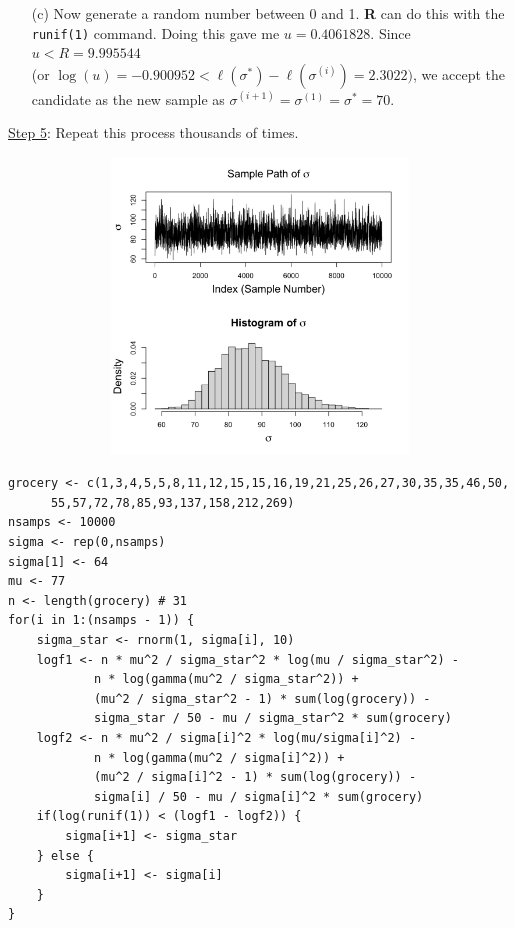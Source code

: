 \documentclass[11pt]{article}
\begin{document}
\begin{enumerate}
\item[(c)] Now generate a random number between 0 and 1. {\bf R} can do this with the \texttt{runif(1)} command. Doing this gave me $u=0.4061828$. Since $u<R=9.995544$ \\(or $\log(u)=-0.900952<\ell(\sigma^*)-\ell\left(\sigma^{(i)}\right)=2.3022)$, we accept the candidate as the new sample as $\sigma^{(i+1)}=\sigma^{(1)}=\sigma^{*}=70$.
\end{enumerate}

\uline{Step 5}: Repeat this process thousands of times.
\begin{figure}[H]
\centering
\includegraphics[width=4.7in,height=3.1in]{bayes_figs/Plots_sigma_metropolis.png} 
\end{figure}
\vspace{-.3in}
\begin{verbatim}
grocery <- c(1,3,4,5,5,8,11,12,15,15,16,19,21,25,26,27,30,35,35,46,50,
      55,57,72,78,85,93,137,158,212,269)
nsamps <- 10000
sigma <- rep(0,nsamps)
sigma[1] <- 64
mu <- 77
n <- length(grocery) # 31
for(i in 1:(nsamps - 1)) {
    sigma_star <- rnorm(1, sigma[i], 10)
    logf1 <- n * mu^2 / sigma_star^2 * log(mu / sigma_star^2) -
            n * log(gamma(mu^2 / sigma_star^2)) +
            (mu^2 / sigma_star^2 - 1) * sum(log(grocery)) -
            sigma_star / 50 - mu / sigma_star^2 * sum(grocery)
    logf2 <- n * mu^2 / sigma[i]^2 * log(mu/sigma[i]^2) -
            n * log(gamma(mu^2 / sigma[i]^2)) +
            (mu^2 / sigma[i]^2 - 1) * sum(log(grocery)) -
            sigma[i] / 50 - mu / sigma[i]^2 * sum(grocery)
    if(log(runif(1)) < (logf1 - logf2)) {
     	sigma[i+1] <- sigma_star
    } else {
     	sigma[i+1] <- sigma[i]
    }
}
\end{verbatim}

\newpage
\end{document}
